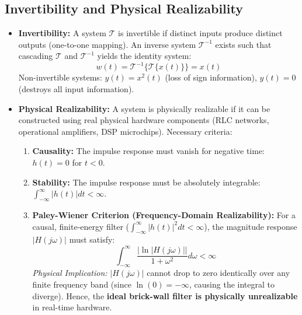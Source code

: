 \documentclass[12pt,a4paper]{article}
\begin{document}
\subsection{Invertibility and Physical Realizability}
\begin{itemize}[leftmargin=*, itemsep=3pt]
  \item \textbf{Invertibility:} A system $\mathcal{T}$ is invertible if distinct inputs produce distinct outputs (one-to-one mapping). An inverse system $\mathcal{T}^{-1}$ exists such that cascading $\mathcal{T}$ and $\mathcal{T}^{-1}$ yields the identity system:
  \begin{equation}
    w(t) = \mathcal{T}^{-1}\{\mathcal{T}\{x(t)\}\} = x(t)
  \end{equation}
  Non-invertible systems: $y(t) = x^2(t)$ (loss of sign information), $y(t) = 0$ (destroys all input information).
  \item \textbf{Physical Realizability:} A system is physically realizable if it can be constructed using real physical hardware components (RLC networks, operational amplifiers, DSP microchips). Necessary criteria:
  \begin{enumerate}[label=(\alph*), itemsep=2pt]
    \item \textbf{Causality:} The impulse response must vanish for negative time: $h(t) = 0$ for $t < 0$.
    \item \textbf{Stability:} The impulse response must be absolutely integrable: $\int_{-\infty}^{\infty} |h(t)| dt < \infty$.
    \item \textbf{Paley-Wiener Criterion (Frequency-Domain Realizability):} For a causal, finite-energy filter ($\int_{-\infty}^{\infty} |h(t)|^2 dt < \infty$), the magnitude response $|H(j\omega)|$ must satisfy:
    \begin{equation}
      \int_{-\infty}^{\infty} \frac{|\ln |H(j\omega)||}{1 + \omega^2} d\omega < \infty
    \end{equation}
    \textit{Physical Implication:} $|H(j\omega)|$ cannot drop to zero identically over any finite frequency band (since $\ln(0) = -\infty$, causing the integral to diverge). Hence, the \textbf{ideal brick-wall filter is physically unrealizable} in real-time hardware.
  \end{enumerate}
\end{itemize}
\end{document}
